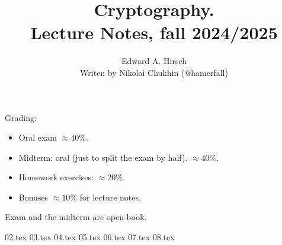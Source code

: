 \documentclass[a4paper,14pt]{extarticle}
\theoremstyle{definition}
\numberwithin{equation}{section} %
\numberwithin{figure}{section} %
\numberwithin{table}{section} %
\begin{document}
    \title{Cryptography. \\ Lecture Notes, fall 2024/2025}
    \author{Edward A. Hirsch \\ Writen by Nikolai Chukhin (@hamerfall)}
    \date{}
    \maketitle
    \newpage

    \tableofcontents
    \newpage

    Grading:
    \begin{itemize}
        \item Oral exam $\approx 40\%$.
        \item Midterm: oral (just to split the exam by half). $\approx 40\%$.
        \item Homework exercises: $\approx 20\%$.
        \item Bonuses $\approx 10\%$ for lecture notes.
    \end{itemize}
    Exam and the midterm are open-book.

    {02.tex}
    {03.tex}
    {04.tex}
    {05.tex}
    {06.tex}
    {07.tex}
    {08.tex}
\end{document}
